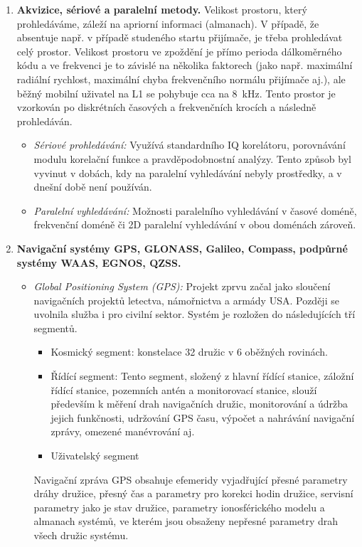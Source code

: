 \documentclass[11pt,a4paper]{article}
\begin{document}
\begin{enumerate}
    \item \textbf{Akvizice, sériové a paralelní metody.} Velikost prostoru, který prohledáváme, záleží na apriorní informaci (almanach). V případě, že absentuje např. v případě studeného startu přijímače, je třeba prohledávat celý prostor. Velikost prostoru ve zpoždění je přímo perioda dálkoměrného kódu a ve frekvenci je to závislé na několika faktorech (jako např. maximální radiální rychlost, maximální chyba frekvenčního normálu přijímače aj.), ale běžný mobilní uživatel na L1 se pohybuje cca na 8~kHz. Tento prostor je vzorkován po diskrétních časových a frekvenčních krocích a následně prohledáván.
    \begin{itemize}
        \item \emph{Sériové prohledávání:} Využívá standardního IQ korelátoru, porovnávání modulu korelační funkce a pravděpodobnostní analýzy. Tento způsob byl vyvinut v dobách, kdy na paralelní vyhledávání nebyly prostředky, a v dnešní době není používán.
        \item \emph{Paralelní vyhledávání:} Možnosti paralelního vyhledávání v časové doméně, frekvenční doméně či 2D paralelní vyhledávání v obou doménách zároveň.
    \end{itemize}
    \item \textbf{Navigační systémy GPS, GLONASS, Galileo, Compass, podpůrné systémy WAAS, EGNOS, QZSS.}
    \begin{itemize}
        \item \emph{Global Positioning System (GPS):} Projekt zprvu začal jako sloučení navigačních projektů letectva, námořnictva a armády USA. Později se uvolnila služba i pro civilní sektor. Systém je rozložen do následujících tří segmentů.
        \begin{itemize}
            \item Kosmický segment: konstelace 32 družic v 6 oběžných rovinách.
            \item Řídící segment: Tento segment, složený z hlavní řídící stanice, záložní řídící stanice, pozemních antén a monitorovací stanice, slouží především k měření drah navigačních družic, monitorování a údržba jejich funkčnosti, udržování GPS času, výpočet a nahrávání navigační zprávy, omezené manévrování aj.
            \item Uživatelský segment
        \end{itemize}
        Navigační zpráva GPS obsahuje efemeridy vyjadřující přesné parametry dráhy družice, přesný čas a parametry pro korekci hodin družice, servisní parametry jako je stav družice, parametry ionosférického modelu a almanach systémů, ve kterém jsou obsaženy nepřesné parametry drah všech družic systému.


\end{itemize}
\end{enumerate}
\end{document}
